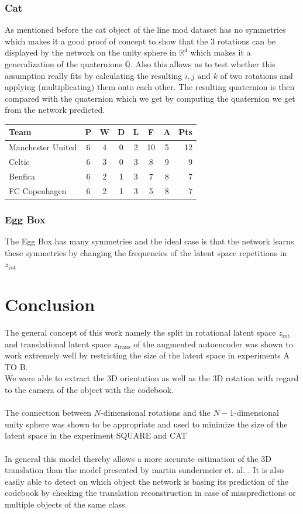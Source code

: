 \documentclass[10pt,a4paper]{article}
\newcommand{\rot}{\ensuremath{\text{rot}\xspace}}
\newcommand{\trans}{\ensuremath{\text{trans}\xspace}}
\begin{document}
\subsubsection{Cat}
As mentioned before the cat object of the line mod dataset has no symmetries which makes it a good proof of concept to show that the 3 rotations can be displayed by the network on the unity sphere in $\mathbb{R}^4$ which makes it a generalization of the quaternions $\mathbb{Q}$. Also this allows us to test whether this assumption really fits by calculating the resulting $i, j \text{ and } k$ of two rotations and applying (multiplicating) them onto each other. The resulting quaternion is then compared with the quaternion which we get by computing the quaternion we get from the network predicted.
\begin{tabular}{l*{6}{c}r}
Team              & P & W & D & L & F  & A & Pts \\
\hline
Manchester United & 6 & 4 & 0 & 2 & 10 & 5 & 12  \\
Celtic            & 6 & 3 & 0 & 3 &  8 & 9 &  9  \\
Benfica           & 6 & 2 & 1 & 3 &  7 & 8 &  7  \\
FC Copenhagen     & 6 & 2 & 1 & 3 &  5 & 8 &  7  \\
\end{tabular}

\subsubsection{Egg Box}
The Egg Box has many symmetries and the ideal case is that the network learns these symmetries by changing the frequencies of the latent space repetitions in $z_{\rot}$
\newpage
\section{Conclusion}
The general concept of this work namely the split in rotational latent space $z_{\rot}$ and translational latent space $z_{\trans}$ of the augmented autoencoder was shown to work  extremely well by restricting the size of the latent space in experiments A TO B.\\
We were able to extract the 3D orientation as well as the 3D rotation with regard to the camera of the object with the codebook.\\
\\
The connection between $N$-dimensional rotations and the $N-1$-dimensional unity sphere was shown to be appropriate and used to minimize the size of the latent space in the experiment SQUARE and CAT\\
\\
In general this model thereby allows a more accurate estimation of the 3D translation than the model presented by martin sundermeier et. al. .
It is also easily able to detect on which object the network is basing its prediction of the codebook by checking the translation reconstruction in case of misspredictions or multiple objects of the same class.\\
\end{document}
